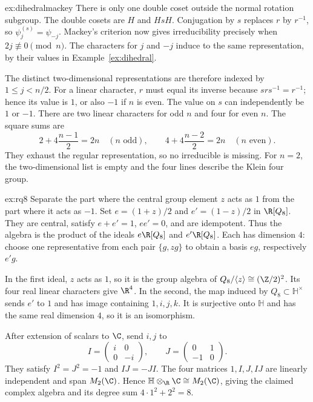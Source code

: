 \begin{solution}{ex:dihedralmackey}
\idea There is only one double coset outside the normal rotation subgroup.
\writeup The double cosets are $H$ and $HsH$. Conjugation by $s$ replaces $r$ by $r^{-1}$, so $\psi_j^{(s)}=\psi_{-j}$. Mackey's criterion now gives irreducibility precisely when $2j\not\equiv0\pmod n$. The characters for $j$ and $-j$ induce to the same representation, by their values in Example~\ref{ex:dihedral}.

The distinct two-dimensional representations are therefore indexed by $1\le j<n/2$. For a linear character, $r$ must equal its inverse because $srs^{-1}=r^{-1}$; hence its value is $1$, or also $-1$ if $n$ is even. The value on $s$ can independently be $1$ or $-1$. There are two linear characters for odd $n$ and four for even $n$. The square sums are
\[
2+4\frac{n-1}{2}=2n\quad(n\text{ odd}),
\qquad
4+4\frac{n-2}{2}=2n\quad(n\text{ even}).
\]
They exhaust the regular representation, so no irreducible is missing. For $n=2$, the two-dimensional list is empty and the four lines describe the Klein four group.
\end{solution}

\begin{solution}{ex:rq8}
\idea Separate the part where the central group element $z$ acts as $1$ from the part where it acts as $-1$.
\writeup Set $e=(1+z)/2$ and $e'=(1-z)/2$ in $\R[Q_8]$. They are central, satisfy $e+e'=1$, $ee'=0$, and are idempotent. Thus the algebra is the product of the ideals $e\R[Q_8]$ and $e'\R[Q_8]$. Each has dimension $4$: choose one representative from each pair $\{g,zg\}$ to obtain a basis $eg$, respectively $e'g$.

In the first ideal, $z$ acts as $1$, so it is the group algebra of $Q_8/\langle z\rangle\cong(\Z/2)^2$. Its four real linear characters give $\R^4$. In the second, the map induced by $Q_8\subset\mathbb H^\times$ sends $e'$ to $1$ and has image containing $1,i,j,k$. It is surjective onto $\mathbb H$ and has the same real dimension $4$, so it is an isomorphism.

After extension of scalars to $\C$, send $i,j$ to
\[
I=\begin{pmatrix}i&0\\0&-i\end{pmatrix},
\qquad J=\begin{pmatrix}0&1\\-1&0\end{pmatrix}.
\]
They satisfy $I^2=J^2=-1$ and $IJ=-JI$. The four matrices $1,I,J,IJ$ are linearly independent and span $M_2(\C)$. Hence $\mathbb H\otimes_\R\C\cong M_2(\C)$, giving the claimed complex algebra and its degree sum $4\cdot1^2+2^2=8$.
\end{solution}

